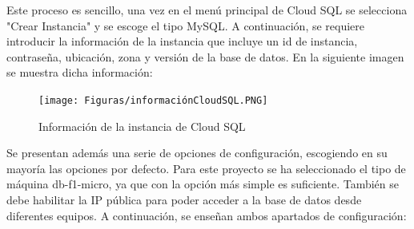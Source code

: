 Este proceso es sencillo, una vez en el menú principal de Cloud SQL se selecciona "Crear Instancia" y se escoge el tipo MySQL. A continuación, se requiere introducir la información de la instancia que incluye un id de instancia, contraseña, ubicación, zona y versión de la base de datos. En la siguiente imagen se muestra dicha información:

\begin{figure}[ht]
    	\begin{center}
    		\texttt{[image: Figuras/informaciónCloudSQL.PNG]}
    	\end{center}
    	\caption{\label{fig:informacionCloudSQL} Información de la instancia de Cloud SQL}
\end{figure}

Se presentan además una serie de opciones de configuración, escogiendo en su mayoría las opciones por defecto. Para este proyecto se ha seleccionado el tipo de máquina db-f1-micro, ya que con la opción más simple es suficiente. También se debe habilitar la IP pública para poder acceder a la base de datos desde diferentes equipos. A continuación, se enseñan ambos apartados de configuración:

\newpage

